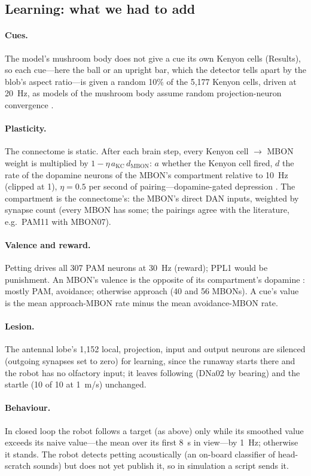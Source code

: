 \documentclass[10pt,a4paper]{article}
\begin{document}
\subsection{Learning: what we had to add}

\paragraph{Cues.} The model's mushroom body does not give a cue its own Kenyon cells (Results), so each
cue---here the ball or an upright bar, which the detector tells apart by the blob's aspect ratio---is
given a random 10\% of the 5{,}177 Kenyon cells, driven at \SI{20}{Hz}, as models of the mushroom body
assume random projection-neuron convergence \cite{caron2013}. \paragraph{Plasticity.} The connectome
is static. After each brain step, every Kenyon cell $\rightarrow$ MBON weight is multiplied by
$1 - \eta\, a_{\mathrm{KC}}\, d_{\mathrm{MBON}}$: $a$ whether the Kenyon cell fired, $d$ the rate of
the dopamine neurons of the MBON's compartment relative to \SI{10}{Hz} (clipped at 1), $\eta = 0.5$ per
second of pairing---dopamine-gated depression \cite{hige2015,cohn2015}. The compartment is the
connectome's: the MBON's direct DAN inputs, weighted by synapse count (every MBON has some; the
pairings agree with the literature, e.g.\ PAM11 with MBON07). \paragraph{Valence and reward.}
Petting drives all 307 PAM neurons at \SI{30}{Hz} (reward); PPL1 would be punishment. An MBON's
valence is the opposite of its compartment's dopamine \cite{aso2014b,owald2015}: mostly PAM,
avoidance; otherwise approach (40 and 56 MBONs). A cue's value is the mean approach-MBON rate minus
the mean avoidance-MBON rate. \paragraph{Lesion.} The antennal lobe's 1{,}152 local, projection,
input and output neurons are silenced (outgoing synapses set to zero) for learning, since the
runaway starts there and the robot has no olfactory input; it leaves following (DNa02 by bearing) and
the startle (10 of 10 at \SI{1}{m/s}) unchanged. \paragraph{Behaviour.} In closed loop the robot
follows a target (as above) only while its smoothed value exceeds its naive value---the mean over
its first \SI{8}{s} in view---by \SI{1}{Hz}; otherwise it stands. The robot detects petting acoustically
(an on-board classifier of head-scratch sounds) but does not yet publish it, so in simulation a script
sends it.
\end{document}
